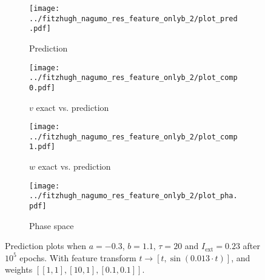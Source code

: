 \documentclass[a4paper]{article}
\begin{document}
\begin{figure}[H]
	\centering 
	\begin{subfigure}[b]{0.47\textwidth}
		\centering
		\texttt{[image: ../fitzhugh\_nagumo\_res\_feature\_onlyb\_2/plot\_pred.pdf]}
		\caption{Prediction}
		\label{fig:justb03a}
	\end{subfigure}
	\begin{subfigure}[b]{0.47\textwidth}
		\centering
		\texttt{[image: ../fitzhugh\_nagumo\_res\_feature\_onlyb\_2/plot\_comp0.pdf]}
		\caption{$v$ exact vs. prediction}
		\label{fig:justb03b}
	\end{subfigure}
	\begin{subfigure}[b]{0.47\textwidth}
		\centering
		\texttt{[image: ../fitzhugh\_nagumo\_res\_feature\_onlyb\_2/plot\_comp1.pdf]}
		\caption{$w$ exact vs. prediction}
		\label{fig:justb03c}
	\end{subfigure}
	\begin{subfigure}[b]{0.47\textwidth}
		\centering
		\texttt{[image: ../fitzhugh\_nagumo\_res\_feature\_onlyb\_2/plot\_pha.pdf]}
		\caption{Phase space}
		\label{fig:justb03d}
	\end{subfigure}
	\caption{Prediction plots when $a=-0.3$, $b=1.1$, $\tau=20$ and $ I_{\text{ext}}=0.23$ after $10^5$ epochs. With feature transform $t \rightarrow \left[ t, \sin(0.013\cdot t) \right] $, and weights $\left[ \left[ 1, 1\right], \left[ 10, 1\right], \left[ 0.1, 0.1\right]\right]$.}
	\label{plot:justb03}
\end{figure} 	
\end{document}
